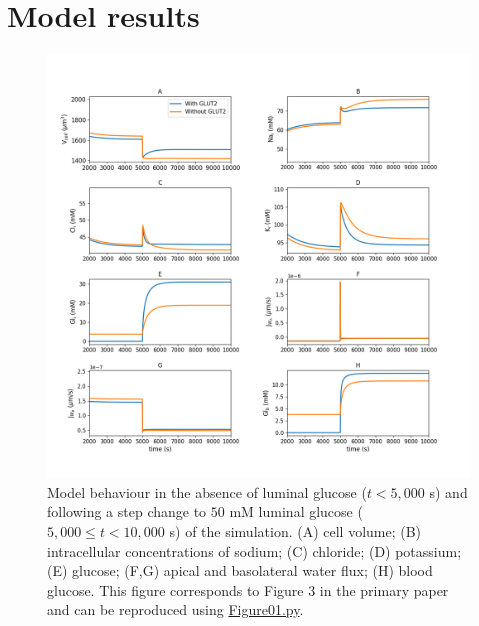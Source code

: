 \documentclass[fleqn,10pt]{physiome}
\begin{document}
\section{Model results}

\begin{figure}[htb]
\centering
\includegraphics[width=0.9\linewidth]{Figure01}
\caption{Model behaviour in the absence of luminal glucose ($t<5,000$ s) and following a step change to $50$ mM luminal glucose ($5,000 \leq t<10,000$ s) of the simulation. (A) cell volume; (B) intracellular concentrations of sodium; (C) chloride; (D) potassium; (E) glucose; (F,G) apical and basolateral water flux; (H) blood glucose. This figure corresponds to Figure 3 in the primary paper and can be reproduced using \href{https://models.physiomeproject.org/workspace/840/rawfile/bc7a5ac43ddbd15d234e66d8cb17df8388d80064/Figure01.py}{Figure01.py}.}
\label{Figure1}
\end{figure}
\end{document}
